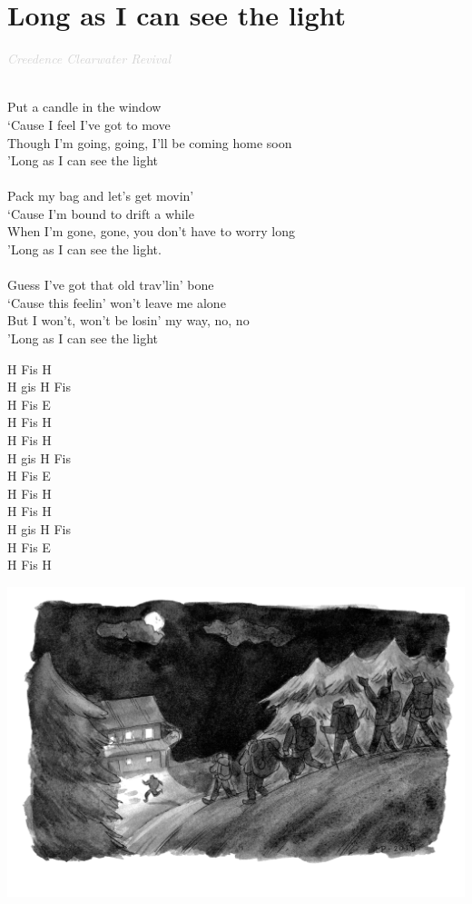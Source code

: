 \documentclass[a5paper, 10pt]{book}
\begin{document}
\section{Long as I can see the light}\textcolor{lightgray}{\textit{Creedence Clearwater Revival}}\\~\\
\begin{minipage}[t]{0.8\textwidth}
Put a candle in the window\\
‘Cause I feel I've got to move\\
Though I'm going, going, I'll be coming home soon\\
'Long as I can see the light\\
\\
Pack my bag and let's get movin'\\
‘Cause I'm bound to drift a while\\
When I'm gone, gone, you don't have to worry long\\
'Long as I can see the light.\\
\\
Guess I've got that old trav'lin' bone\\
‘Cause this feelin' won't leave me alone\\
But I won't, won't be losin' my way, no, no\\
'Long as I can see the light\\
\end{minipage}
\begin{minipage}[t]{0.2\textwidth}
H Fis H\\
H gis H Fis\\
H Fis E\\
H Fis H\\

H Fis H\\
H gis H Fis\\
H Fis E\\
H Fis H\\

H Fis H\\
H gis H Fis\\
H Fis E\\
H Fis H\\
\end{minipage}
\vfill
\includegraphics[width=\textwidth, center]{images/long_as_i_can_see_the_light.png}\\
\end{document}
